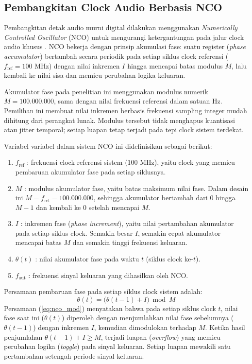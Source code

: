 \subsection{Pembangkitan Clock Audio Berbasis NCO}

Pembangkitan detak audio murni digital dilakukan menggunakan \textit{Numerically Controlled Oscillator} (NCO) untuk mengurangi ketergantungan pada jalur clock audio khusus \citep{vankka_dds_2001,ao2012nco}. NCO bekerja dengan prinsip akumulasi fase: suatu register (\textit{phase accumulator}) bertambah secara periodik pada setiap siklus clock referensi ($f_{\mathrm{ref}} = 100$ MHz) dengan nilai inkremen $I$ hingga mencapai batas modulus $M$, lalu kembali ke nilai sisa dan memicu perubahan logika keluaran.

Akumulator fase pada penelitian ini menggunakan modulus numerik $M=100.000.000$, sama dengan nilai frekuensi referensi dalam satuan Hz. Pemilihan ini membuat nilai inkremen berbasis frekuensi sampling integer mudah dihitung dari perangkat lunak. Modulus tersebut tidak menghapus kuantisasi atau jitter temporal; setiap luapan tetap terjadi pada tepi clock sistem terdekat.

Variabel-variabel dalam sistem NCO ini didefinisikan sebagai berikut:
\begin{enumerate}
    \item $f_{\mathrm{ref}}$ : frekuensi clock referensi sistem (100 MHz), yaitu clock yang memicu pembaruan akumulator fase pada setiap siklusnya.
    \item $M$ : modulus akumulator fase, yaitu batas maksimum nilai fase. Dalam desain ini $M = f_{\mathrm{ref}} = 100.000.000$, sehingga akumulator bertambah dari $0$ hingga $M-1$ dan kembali ke $0$ setelah mencapai $M$.
    \item $I$ : inkremen fase (\textit{phase increment}), yaitu nilai pertambahan akumulator pada setiap siklus clock. Semakin besar $I$, semakin cepat akumulator mencapai batas $M$ dan semakin tinggi frekuensi keluaran.
    \item $\theta(t)$ : nilai akumulator fase pada waktu $t$ (siklus clock ke-$t$).
    \item $f_{\mathrm{out}}$ : frekuensi sinyal keluaran yang dihasilkan oleh NCO.
\end{enumerate}

Persamaan pembaruan fase pada setiap siklus clock sistem adalah:
\begin{equation}
    \theta(t) = \bigl(\theta(t-1) + I\bigr) \bmod M
    \label{eq:nco_mod}
\end{equation}
Persamaan (\ref{eq:nco_mod}) menyatakan bahwa pada setiap siklus clock $t$, nilai fase saat ini ($\theta(t)$) diperoleh dengan menjumlahkan nilai fase sebelumnya ($\theta(t-1)$) dengan inkremen $I$, kemudian dimodulokan terhadap $M$. Ketika hasil penjumlahan $\theta(t-1) + I \ge M$, terjadi luapan (\textit{overflow}) yang memicu perubahan logika (\textit{toggle}) pada sinyal keluaran. Setiap luapan mewakili satu pertambahan setengah periode sinyal keluaran.

